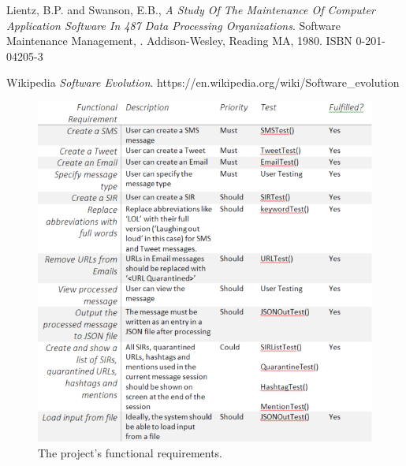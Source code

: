 \documentclass[a4paper]{article}
\begin{document}
\newpage
\begin{thebibliography}{9}
  Lientz, B.P. and Swanson, E.B., 
  \emph{A Study Of The Maintenance Of Computer Application Software In 487 Data Processing Organizations}.
  Software Maintenance Management, . Addison-Wesley, Reading MA, 1980. ISBN 0-201-04205-3

  Wikipedia
  \emph{Software Evolution}. https://en.wikipedia.org/wiki/Software_evolution

\newpage
\begin{figure}
\centering
\includegraphics[width=1\textwidth]{funRequirements.PNG}
\caption{\label{fig:funRequirementsTable}The project's functional requirements.}
\end{figure}


\end{thebibliography}
\end{document}
